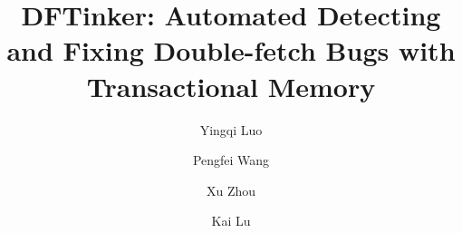 \documentclass[10pt]{llncs}
\begin{document}
\title{DFTinker: Automated Detecting and Fixing Double-fetch Bugs with Transactional Memory}

\author{
Yingqi Luo \and
Pengfei Wang \and
Xu Zhou \and
Kai Lu}


\maketitle


\end{document}
